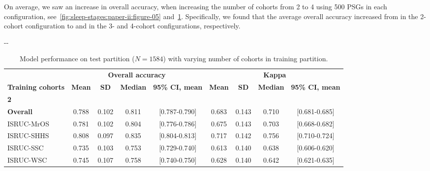 On average, we saw an increase in overall accuracy, when increasing the number of cohorts from 2 to 4 using 500 \acp{PSG} in each configuration, see~\cref{fig:sleep-stages:paper-ii:figure-05} and~\cref{tab:sleep-stages:paper-ii:table-s04}.
Specifically, we found that the average overall accuracy increased from  in the 2-cohort configuration to  and  in the 3- and 4-cohort configurations, respectively.

\begin{table}[p]
\begin{adjustwidth*}{}{-\marginparwidth-\marginparsep}
\begin{threeparttable}
\footnotesize
\caption[\acs{MASSC}v2 test performance.]{Model performance on test partition (\(N=1584\)) with varying number of cohorts in training partition.}
\label{tab:sleep-stages:paper-ii:table-s04}
\begin{tabular}{@{}lcccccccc@{}}
\toprule
                          & \multicolumn{4}{c}{\textbf{Overall accuracy}}                         & \multicolumn{4}{c}{\textbf{Kappa}}                                    \\ \cline{2-9}
\textbf{Training cohorts} & \textbf{Mean} & \textbf{SD} & \textbf{Median} & \textbf{95\% CI, mean} & \textbf{Mean} & \textbf{SD} & \textbf{Median} & \textbf{95\% CI, mean} \\ \midrule
\textbf{2}                &               &             &                 &                       &               &             &                 &                       \\
\textbf{Overall}          & 0.788         & 0.102       & 0.811           & [0.787-0.790]         & 0.683         & 0.143       & 0.710           & [0.681-0.685]         \\
\acs{ISRUC}-\acs{MrOS}                & 0.781         & 0.102       & 0.804           & [0.776-0.786]         & 0.675         & 0.143       & 0.703           & [0.668-0.682]         \\
\acs{ISRUC}-\acs{SHHS}                & 0.808         & 0.097       & 0.835           & [0.804-0.813]         & 0.717         & 0.142       & 0.756           & [0.710-0.724]         \\
\acs{ISRUC}-\acs{SSC}                 & 0.735         & 0.103       & 0.753           & [0.729-0.740]         & 0.613         & 0.140       & 0.638           & [0.606-0.620]         \\
\acs{ISRUC}-\acs{WSC}                 & 0.745         & 0.107       & 0.758           & [0.740-0.750]         & 0.628         & 0.140       & 0.642           & [0.621-0.635]         \\

\end{tabular}
\end{threeparttable}
\end{adjustwidth*}
\end{table}

